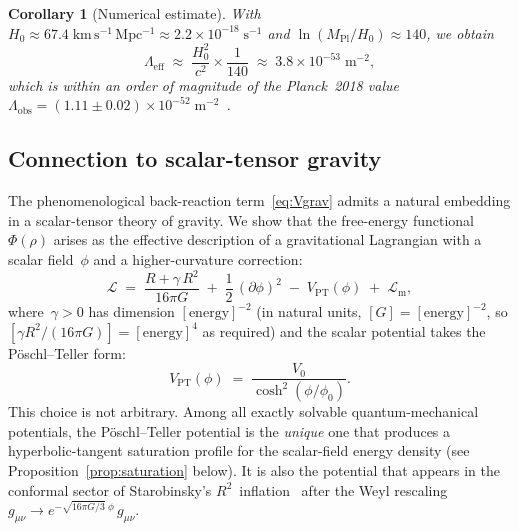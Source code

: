 \documentclass[12pt,a4paper]{article}
\theoremstyle{definition}
\theoremstyle{plain}
\newtheorem{corollary}[definition]{Corollary}
\theoremstyle{remark}
\newcommand{\Leff}{\Lambda_{\mathrm{eff}}}
\begin{document}
\begin{corollary}[Numerical estimate]\label{cor:numerical}
With $H_0 \approx 67.4\;\mathrm{km\,s^{-1}\,Mpc^{-1}}
\approx 2.2 \times 10^{-18}\;\mathrm{s^{-1}}$ and
$\ln(M_{\mathrm{Pl}}/H_0) \approx 140$, we obtain
\begin{equation}
  \Leff \;\approx\;
  \frac{H_0^{2}}{c^{2}} \times \frac{1}{140}
  \;\approx\; 3.8 \times 10^{-53}\;\mathrm{m}^{-2},
\end{equation}
which is within an order of magnitude of the Planck~2018
value~$\Lambda_{\mathrm{obs}} = (1.11 \pm 0.02) \times 10^{-52}\;
\mathrm{m}^{-2}$~\cite{Planck2018}.
\end{corollary}

\subsection{Connection to scalar-tensor gravity}\label{sec:scalar-tensor}\label{sec:saturation}

The phenomenological back-reaction term~\eqref{eq:Vgrav} admits a
natural embedding in a scalar-tensor theory of gravity. We show that
the free-energy functional~$\Phi(\rho)$ arises as the effective
description of a gravitational Lagrangian with a scalar field~$\phi$
and a higher-curvature correction:
\begin{equation}\label{eq:Lagrangian}
  \mathcal{L} \;=\;
  \frac{R + \gamma\,R^{2}}{16\pi G}
  \;+\; \frac{1}{2}\,(\partial\phi)^{2}
  \;-\; V_{\mathrm{PT}}(\phi)
  \;+\; \mathcal{L}_{\mathrm{m}},
\end{equation}
where~$\gamma > 0$ has dimension $[\mathrm{energy}]^{-2}$ (in natural units, $[G] = [\mathrm{energy}]^{-2}$, so $[\gamma R^2/(16\pi G)] = [\mathrm{energy}]^4$ as required) and the scalar
potential takes the P\"oschl--Teller form:
\begin{equation}\label{eq:VPT}
  V_{\mathrm{PT}}(\phi) \;=\;
  \frac{V_{0}}{\cosh^{2}(\phi/\phi_{0})}.
\end{equation}
This choice is not arbitrary. Among all exactly solvable quantum-mechanical
potentials, the P\"oschl--Teller potential is the \emph{unique} one that
produces a hyperbolic-tangent saturation profile for the scalar-field
energy density (see Proposition~\ref{prop:saturation} below). It is also
the potential that appears in the conformal sector of Starobinsky's
$R^{2}$~inflation~\cite{Starobinsky1980} after the Weyl rescaling
$g_{\mu\nu} \to e^{-\sqrt{16\pi G/3}\;\phi}\,g_{\mu\nu}$.
\end{document}
